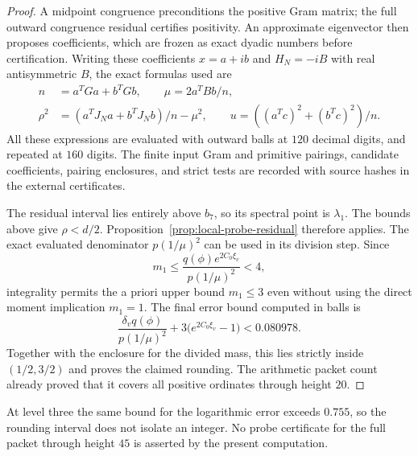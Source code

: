 \begin{proof}
A midpoint congruence preconditions the positive Gram matrix; the
full outward congruence residual certifies positivity.  An approximate
eigenvector then proposes coefficients, which are frozen as exact
dyadic numbers before certification.  Writing these coefficients
$x=a+ib$ and $H_N=-iB$ with real antisymmetric $B$, the exact formulas
used are
\[
 \begin{split}
 n&=a^TGa+b^TGb,\qquad
 \mu=2a^TBb/n,\\
 \rho^2&=(a^TJ_Na+b^TJ_Nb)/n-\mu^2,\qquad
 u=((a^Tc)^2+(b^Tc)^2)/n.
 \end{split}
\]
All these expressions are evaluated with outward balls at $120$
decimal digits, and repeated at $160$ digits.  The finite input
Gram and primitive pairings, candidate coefficients, pairing
enclosures, and strict tests are recorded with source hashes in the
external certificates.

The residual interval lies entirely above $b_7$, so its spectral
point is $\lambda_1$.  The bounds above give $\rho<d/2$.
Proposition~\ref{prop:local-probe-residual} therefore applies.
The exact evaluated denominator $p(1/\mu)^2$ can be used in its
division step.  Since
\[
 m_1\le\frac{q(\phi)e^{2C_0\xi_v}}{p(1/\mu)^2}<4,
\]
integrality permits the a priori upper bound $m_1\le3$ even without
using the direct moment implication $m_1=1$.  The final error bound
computed in balls is
\[
 \frac{\delta_vq(\phi)}{p(1/\mu)^2}
             +3\bigl(e^{2C_0\xi_v}-1\bigr)<0.080978.
\]
Together with the enclosure for the divided mass, this lies
strictly inside $(1/2,3/2)$ and proves the claimed rounding.
The arithmetic packet count already proved that it covers all
positive ordinates through height $20$.
\end{proof}

At level three the same bound for the logarithmic error exceeds
$0.755$, so the rounding interval does not isolate an integer.  No probe certificate for the full packet through height
$45$ is asserted by the present computation.

